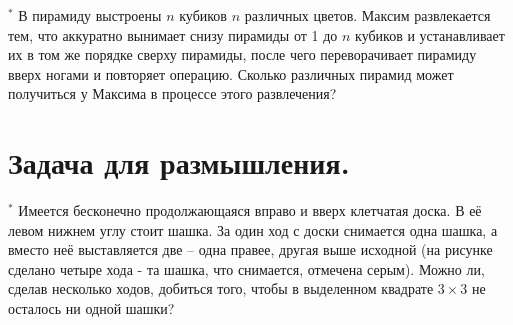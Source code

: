 \begin{thm} $^*$
    В  пирамиду выстроены $n$ кубиков $n$ различных цветов. Максим развлекается тем, что аккуратно вынимает снизу пирамиды от 1 до $n$ кубиков и устанавливает их в том же порядке сверху пирамиды, после чего переворачивает пирамиду вверх ногами и повторяет операцию. Сколько различных пирамид может получиться у Максима в процессе этого развлечения?
\end{thm}

\section{Задача для размышления.}

\begin{thm} $^*$
    Имеется бесконечно продолжающаяся вправо и вверх клетчатая доска. В её левом нижнем углу стоит шашка. За один ход с доски снимается одна шашка, а вместо неё выставляется две – одна правее, другая выше исходной (на рисунке сделано четыре хода - та шашка, что снимается, отмечена серым). Можно ли, сделав несколько ходов, добиться того, чтобы в выделенном квадрате $3 \times 3$ не осталось ни одной шашки? %
    

\end{thm}
